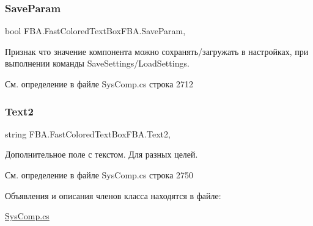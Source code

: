 \subsubsection{\texorpdfstring{Save\+Param}{SaveParam}}
{\footnotesize\ttfamily bool F\+B\+A.\+Fast\+Colored\+Text\+Box\+F\+B\+A.\+Save\+Param\hspace{0.3cm}{\ttfamily [get]}, {\ttfamily [set]}}



Признак что значение компонента можно сохранять/загружать в настройках, при выполнении команды Save\+Settings/\+Load\+Settings. 



См. определение в файле Sys\+Comp.\+cs строка 2712

\mbox{\label{class_f_b_a_1_1_fast_colored_text_box_f_b_a_a9fa5173369751f7587b5626684f9edb7}} 
\subsubsection{\texorpdfstring{Text2}{Text2}}
{\footnotesize\ttfamily string F\+B\+A.\+Fast\+Colored\+Text\+Box\+F\+B\+A.\+Text2\hspace{0.3cm}{\ttfamily [get]}, {\ttfamily [set]}}



Дополнительное поле с текстом. Для разных целей. 



См. определение в файле Sys\+Comp.\+cs строка 2750



Объявления и описания членов класса находятся в файле\+:\begin{DoxyCompactItemize}
\item 
\mbox{\hyperlink{_sys_comp_8cs}{Sys\+Comp.\+cs}}\end{DoxyCompactItemize}
